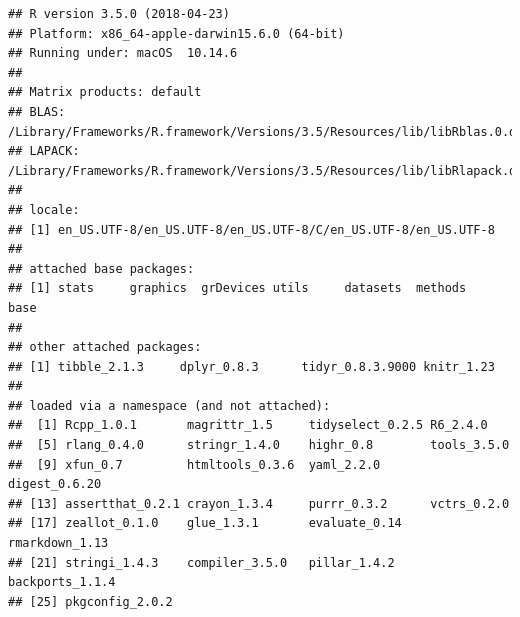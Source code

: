 \documentclass[]{article}
\begin{document}
\begin{verbatim}
## R version 3.5.0 (2018-04-23)
## Platform: x86_64-apple-darwin15.6.0 (64-bit)
## Running under: macOS  10.14.6
## 
## Matrix products: default
## BLAS: /Library/Frameworks/R.framework/Versions/3.5/Resources/lib/libRblas.0.dylib
## LAPACK: /Library/Frameworks/R.framework/Versions/3.5/Resources/lib/libRlapack.dylib
## 
## locale:
## [1] en_US.UTF-8/en_US.UTF-8/en_US.UTF-8/C/en_US.UTF-8/en_US.UTF-8
## 
## attached base packages:
## [1] stats     graphics  grDevices utils     datasets  methods   base     
## 
## other attached packages:
## [1] tibble_2.1.3     dplyr_0.8.3      tidyr_0.8.3.9000 knitr_1.23      
## 
## loaded via a namespace (and not attached):
##  [1] Rcpp_1.0.1       magrittr_1.5     tidyselect_0.2.5 R6_2.4.0        
##  [5] rlang_0.4.0      stringr_1.4.0    highr_0.8        tools_3.5.0     
##  [9] xfun_0.7         htmltools_0.3.6  yaml_2.2.0       digest_0.6.20   
## [13] assertthat_0.2.1 crayon_1.3.4     purrr_0.3.2      vctrs_0.2.0     
## [17] zeallot_0.1.0    glue_1.3.1       evaluate_0.14    rmarkdown_1.13  
## [21] stringi_1.4.3    compiler_3.5.0   pillar_1.4.2     backports_1.1.4 
## [25] pkgconfig_2.0.2
\end{verbatim}
\end{document}
